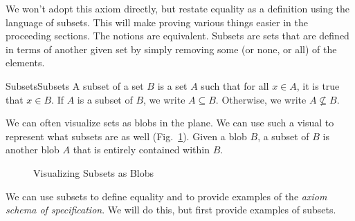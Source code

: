         We won't adopt this axiom directly, but restate equality as a definition
        using the language of subsets. This will make proving various things
        easier in the proceeding sections. The notions are equivalent. Subsets
        are sets that are defined in terms of another given set by simply
        removing some (or none, or all) of the elements.
        \begin{fdefinition}{Subsets}{Subsets}
            A \gls{subset} of a \gls{set} $B$ is a set $A$ such that for all
            $x\in{A}$, it is true that $x\in{B}$. If $A$ is a subset of $B$, we
            write $A\subseteq{B}$. Otherwise, we write $A\nsubseteq{B}$.
        \end{fdefinition}
        We can often visualize sets as blobs in the plane. We can use such a
        visual to represent what subsets are as well
        (Fig.~\ref{fig:Subset_Blobs}). Given a blob $B$, a subset of $B$ is
        another blob $A$ that is entirely contained within $B$.
        \begin{figure}[H]
            \centering
            
            \caption{Visualizing Subsets as Blobs}
            \label{fig:Subset_Blobs}
        \end{figure}
        We can use subsets to define equality and to provide examples
        of the \textit{axiom schema of specification}. We will do this,
        but first provide examples of subsets.

